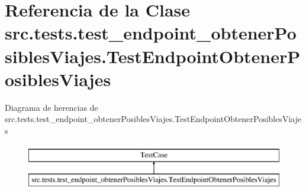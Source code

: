 \hypertarget{classsrc_1_1tests_1_1test__endpoint__obtener_posibles_viajes_1_1_test_endpoint_obtener_posibles_viajes}{\section{Referencia de la Clase src.\-tests.\-test\-\_\-endpoint\-\_\-obtener\-Posibles\-Viajes.\-Test\-Endpoint\-Obtener\-Posibles\-Viajes}
\label{classsrc_1_1tests_1_1test__endpoint__obtener_posibles_viajes_1_1_test_endpoint_obtener_posibles_viajes}
}
Diagrama de herencias de src.\-tests.\-test\-\_\-endpoint\-\_\-obtener\-Posibles\-Viajes.\-Test\-Endpoint\-Obtener\-Posibles\-Viajes\begin{figure}[H]
\begin{center}
\leavevmode
\includegraphics[height=2.000000cm]{classsrc_1_1tests_1_1test__endpoint__obtener_posibles_viajes_1_1_test_endpoint_obtener_posibles_viajes}
\end{center}
\end{figure}
